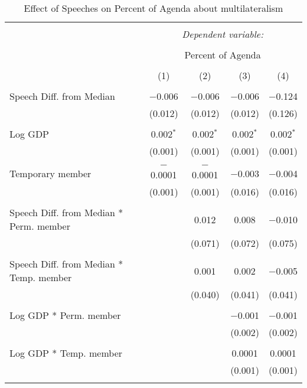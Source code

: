 
\begin{table}[!htbp] \centering 
  \caption{Effect of Speeches on Percent of Agenda about multilateralism} 
  \label{} 
\begin{tabular}{@{\extracolsep{5pt}}lcccc} 
\\[-1.8ex]\hline 
\hline \\[-1.8ex] 
 & \multicolumn{4}{c}{\textit{Dependent variable:}} \\ 
\cline{2-5} 
\\[-1.8ex] & \multicolumn{4}{c}{Percent of Agenda} \\ 
\\[-1.8ex] & (1) & (2) & (3) & (4)\\ 
\hline \\[-1.8ex] 
 Speech Diff. from Median & $-$0.006 & $-$0.006 & $-$0.006 & $-$0.124 \\ 
  & (0.012) & (0.012) & (0.012) & (0.126) \\ 
  & & & & \\ 
 Log GDP & 0.002$^{*}$ & 0.002$^{*}$ & 0.002$^{*}$ & 0.002$^{*}$ \\ 
  & (0.001) & (0.001) & (0.001) & (0.001) \\ 
  & & & & \\ 
 Temporary member & $-$0.0001 & $-$0.0001 & $-$0.003 & $-$0.004 \\ 
  & (0.001) & (0.001) & (0.016) & (0.016) \\ 
  & & & & \\ 
 Speech Diff. from Median * Perm. member &  & 0.012 & 0.008 & $-$0.010 \\ 
  &  & (0.071) & (0.072) & (0.075) \\ 
  & & & & \\ 
 Speech Diff. from Median * Temp. member &  & 0.001 & 0.002 & $-$0.005 \\ 
  &  & (0.040) & (0.041) & (0.041) \\ 
  & & & & \\ 
 Log GDP * Perm. member &  &  & $-$0.001 & $-$0.001 \\ 
  &  &  & (0.002) & (0.002) \\ 
  & & & & \\ 
 Log GDP * Temp. member &  &  & 0.0001 & 0.0001 \\ 
  &  &  & (0.001) & (0.001) \\ 
  & & & & \\ 

\end{tabular}
\end{table}
